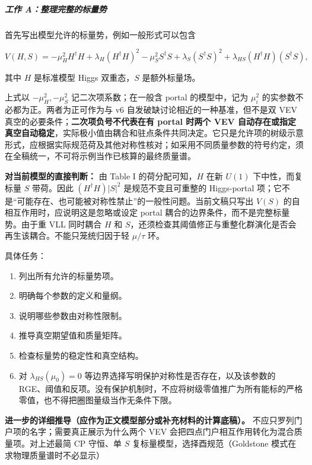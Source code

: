 \documentclass[
]{article}
\begin{document}
\subparagraph{工作
A：整理完整的标量势}\label{ux5de5ux4f5c-aux6574ux7406ux5b8cux6574ux7684ux6807ux91cfux52bf}

首先写出模型允许的标量势，例如一般形式可以包含

\[
V(H,S)=
-\mu_H^2 H^\dagger H
+\lambda_H(H^\dagger H)^2
-\mu_S^2 S^\dagger S
+\lambda_S(S^\dagger S)^2
+\lambda_{HS}(H^\dagger H)(S^\dagger S),
\]

其中 \(H\) 是标准模型 Higgs 双重态，\(S\) 是额外标量场。

上式以 \(-\mu_H^2,-\mu_S^2\) 记二次项系数；在一般含 portal
的模型中，记为 \(\mu_i^2\) 的实参数不必都为正。两者为正可作为与 v6
自发破缺讨论相近的一种基准，但不是双 VEV
真空的必要条件；\textbf{二次项负号不代表在有 portal 时两个 VEV
自动存在或指定真空自动稳定}，实际极小值由耦合和驻点条件共同决定。它只是允许项的树级示意形式，应根据实际规范荷及其他对称性核对；如采用不同质量参数的符号约定，须在全稿统一，不可将示例当作已核算的最终质量谱。

\textbf{对当前模型的直接判断：} 由 Table I 的荷分配可知，\(H\) 在新
\(U(1)\) 下中性，而复标量 \(S\) 带荷。因此 \((H^\dagger H)|S|^2\)
是规范不变且可重整的 Higgs-portal
项；它不是``可能存在、也可能被对称性禁止''的一般性问题。当前文稿只写出
\(V(S)\) 的自相互作用时，应说明这是忽略或设定 portal
耦合的边界条件，而不是完整标量势。由于重 VLL 同时耦合 \(H\) 和
\(S\)，还须检查其阈值修正与重整化群演化是否会再生该耦合。不能只笼统归因于轻
\(\mu/\tau\) 环。

具体任务：

\begin{enumerate}
\def\labelenumi{\arabic{enumi}.}
\item
  列出所有允许的标量势项。
\item
  明确每个参数的定义和量纲。
\item
  说明哪些参数由对称性限制。
\item
  推导真空期望值和质量矩阵。
\item
  检查标量势的稳定性和真空结构。
\item
  对 \(\lambda_{HS}(\mu_0)=0\)
  等边界选择写明保护对称性是否存在，以及该参数的
  RGE、阈值和反项。没有保护机制时，不应将树级零值推广为所有能标的严格零值，也不得把圈图量级当作无条件下限。
\end{enumerate}

\textbf{进一步的详细推导（应作为正文模型部分或补充材料的计算底稿）。}
不应只罗列门户项的名字；需要真正展示为什么两个 VEV
会把四点门户相互作用转化为混合质量项。对上述最简 CP 守恒、单 \(S\)
复标量模型，选择酉规范（Goldstone 模式在求物理质量谱时不必显示）
\end{document}
